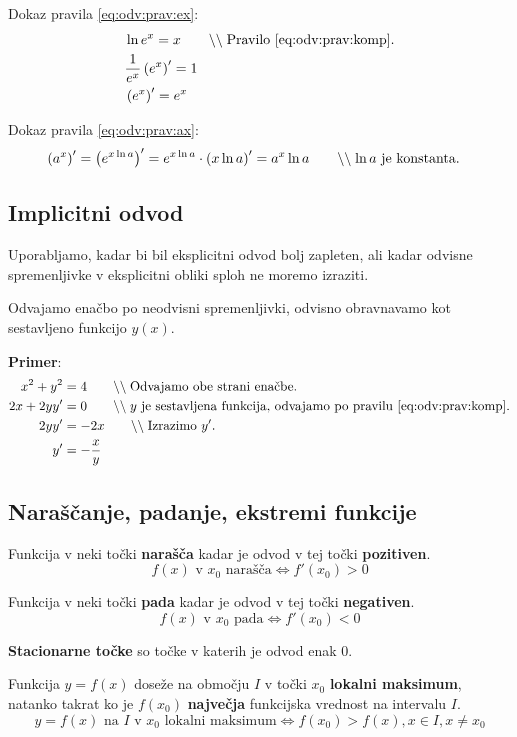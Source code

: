 \documentclass[a4paper,oneside,12pt,fleqn]{article}
\newcommand\krat\cdot
\newcommand{\comment}[1]{\ensuremath{\qquad\backslash\backslash\;}\textnormal{#1}}
\renewcommand\iff\Leftrightarrow
\numberwithin{equation}{section}
\begin{document}
Dokaz pravila \eqref{eq:odv:prav:ex}:
\begin{align*}
  & \ln e^x = x \comment{Pravilo \eqref{eq:odv:prav:komp}.} \\
  & \frac{1}{e^x}\left( e^x \right)' = 1 \\
  & \left( e^x \right)' = e^x
\end{align*}

Dokaz pravila \eqref{eq:odv:prav:ax}:
\begin{align*}
  & \left(a^x\right)' = \left( e^{x\ln a} \right)' = e^{x\ln a}\krat \left(x\ln a\right)'
  = a^x\ln a \comment{$\ln a$ je konstanta.}
\end{align*}

\subsection{Implicitni odvod}
\label{sec:odv:impl}
Uporabljamo, kadar bi bil eksplicitni odvod bolj zapleten, ali kadar odvisne spremenljivke
v eksplicitni obliki sploh ne moremo izraziti.

Odvajamo enačbo po neodvisni spremenljivki, odvisno obravnavamo kot sestavljeno funkcijo
$y(x)$.

\textbf{Primer}:
\begin{align*}
  x^2 + y^2 &= 4  \comment{Odvajamo obe strani enačbe.} \\
  2x + 2yy' &= 0  \comment{$y$ je sestavljena funkcija, odvajamo po pravilu
  \eqref{eq:odv:prav:komp}.} \\
  2yy' &= -2x \comment{Izrazimo $y'$.} \\
  y' &= -\frac{x}{y} 
\end{align*}


\subsection{Naraščanje, padanje, ekstremi funkcije}
\label{sec:odv:eks}

Funkcija v neki točki \textbf{narašča} kadar je odvod v tej točki \textbf{pozitiven}.
\[ f(x) \text{ v } x_0 \text{ narašča} \iff f'(x_0) > 0 \]

Funkcija v neki točki \textbf{pada} kadar je odvod v tej točki \textbf{negativen}.
\[ f(x) \text{ v } x_0 \text{ pada} \iff f'(x_0) < 0 \]

\textbf{Stacionarne točke} so točke v katerih je odvod enak 0.

Funkcija $y=f(x)$ doseže na območju $I$ v točki $x_0$ \textbf{lokalni maksimum}, natanko takrat ko je $f(x_0)$
\textbf{največja} funkcijska vrednost na intervalu $I$.
\[ y = f(x) \text{ na } I \text{ v } x_0 \text{ lokalni maksimum} \iff
f(x_0) > f(x), x \in I, x \neq x_0 \]
\end{document}
